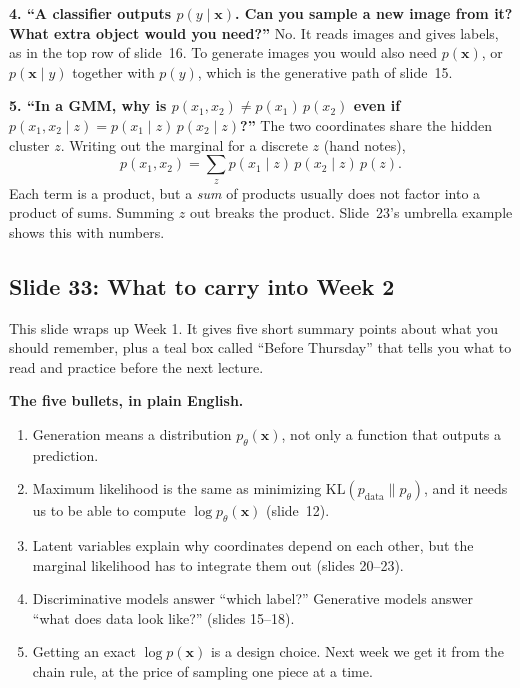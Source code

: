 \textbf{4. ``A classifier outputs $p(y\mid\mathbf{x})$. Can you sample a new image from it? What extra object would you need?''} No. It reads images and gives labels, as in the top row of slide~16. To generate images you would also need $p(\mathbf{x})$, or $p(\mathbf{x}\mid y)$ together with $p(y)$, which is the generative path of slide~15.

\textbf{5. ``In a GMM, why is $p(x_1,x_2)\neq p(x_1)\,p(x_2)$ even if $p(x_1,x_2\mid z)=p(x_1\mid z)\,p(x_2\mid z)$?''} The two coordinates share the hidden cluster $z$. Writing out the marginal for a discrete $z$ (hand notes),
\[
p(x_1,x_2)=\sum_{z}p(x_1\mid z)\,p(x_2\mid z)\,p(z).
\]
Each term is a product, but a \textit{sum} of products usually does not factor into a product of sums. Summing $z$ out breaks the product. Slide~23's umbrella example shows this with numbers.

\subsection*{Slide 33: What to carry into Week 2}

This slide wraps up Week 1. It gives five short summary points about what you should remember, plus a teal box called ``Before Thursday'' that tells you what to read and practice before the next lecture.

\textbf{The five bullets, in plain English.}
\begin{enumerate}
\item Generation means a distribution $p_\theta(\mathbf{x})$, not only a function that outputs a prediction.
\item Maximum likelihood is the same as minimizing $\mathrm{KL}(p_{\text{data}}\|p_\theta)$, and it needs us to be able to compute $\log p_\theta(\mathbf{x})$ (slide~12).
\item Latent variables explain why coordinates depend on each other, but the marginal likelihood has to integrate them out (slides 20--23).
\item Discriminative models answer ``which label?'' Generative models answer ``what does data look like?'' (slides 15--18).
\item Getting an exact $\log p(\mathbf{x})$ is a design choice. Next week we get it from the chain rule, at the price of sampling one piece at a time.
\end{enumerate}

